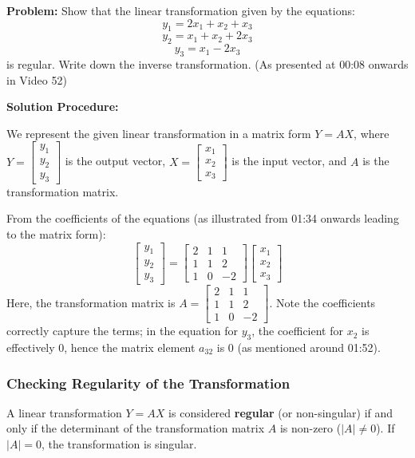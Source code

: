 \documentclass{article}
\begin{document}
\textbf{Problem:}
Show that the linear transformation given by the equations:
\[ y_1 = 2x_1 + x_2 + x_3 \]
\[ y_2 = x_1 + x_2 + 2x_3 \]
\[ y_3 = x_1 - 2x_3 \]
is regular. Write down the inverse transformation. (As presented at 00:08 onwards in Video 52)

\textbf{Solution Procedure:}

We represent the given linear transformation in a matrix form $Y = AX$, where $Y = \begin{bmatrix} y_1 \\ y_2 \\ y_3 \end{bmatrix}$ is the output vector, $X = \begin{bmatrix} x_1 \\ x_2 \\ x_3 \end{bmatrix}$ is the input vector, and $A$ is the transformation matrix.

From the coefficients of the equations (as illustrated from 01:34 onwards leading to the matrix form):
\[ \begin{bmatrix} y_1 \\ y_2 \\ y_3 \end{bmatrix} = \begin{bmatrix} 2 & 1 & 1 \\ 1 & 1 & 2 \\ 1 & 0 & -2 \end{bmatrix} \begin{bmatrix} x_1 \\ x_2 \\ x_3 \end{bmatrix} \]
Here, the transformation matrix is $A = \begin{bmatrix} 2 & 1 & 1 \\ 1 & 1 & 2 \\ 1 & 0 & -2 \end{bmatrix}$. Note the coefficients correctly capture the terms; in the equation for $y_3$, the coefficient for $x_2$ is effectively 0, hence the matrix element $a_{32}$ is 0 (as mentioned around 01:52).

\subsubsection*{Checking Regularity of the Transformation}

A linear transformation $Y = AX$ is considered \textbf{regular} (or non-singular) if and only if the determinant of the transformation matrix $A$ is non-zero ($|A| \neq 0$). If $ |A| = 0$, the transformation is singular.
\end{document}
